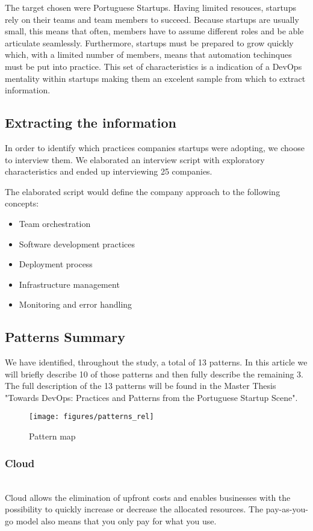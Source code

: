 \documentclass{llncs}
\begin{document}
    The target chosen were Portuguese Startups. Having limited resouces, startups rely on their teams and team members to succeed. Because startups are usually small, this means that often, members have to assume different roles and be able articulate seamlessly. Furthermore, startups must be prepared to grow quickly which, with a limited number of members, means that automation techinques must be put into practice. This set of characteristics is a indication of a DevOps mentality within startups making them an excelent sample from which to extract information.

  \subsection{Extracting the information}

  In order to identify which practices companies startups were adopting, we choose to interview them. We elaborated an interview script with exploratory characteristics and ended up interviewing 25 companies.

  The elaborated script would define the company approach to the following concepts:
  \begin{itemize}
    \item Team orchestration
    \item Software development practices
    \item Deployment process
    \item Infrastructure management
    \item Monitoring and error handling
  \end{itemize}

  \subsection{Patterns Summary}
  We have identified, throughout the study, a total of 13 patterns. In this article we will briefly describe 10 of those patterns and then fully describe the remaining 3.
  The full description of the 13 patterns will be found in the Master Thesis "Towards DevOps: Practices and Patterns from the Portuguese Startup Scene".

  \begin{figure}[ht]
    \centering \texttt{[image: figures/patterns\_rel]}
    \caption{Pattern map}
    \label{fig:rel_patterns}
  \end{figure}


    \subsubsection{Cloud}~\\
    Cloud allows the elimination of upfront costs and enables businesses with the possibility to quickly increase or decrease the allocated resources. The pay-as-you-go model also means that you only pay for what you use.
\end{document}
